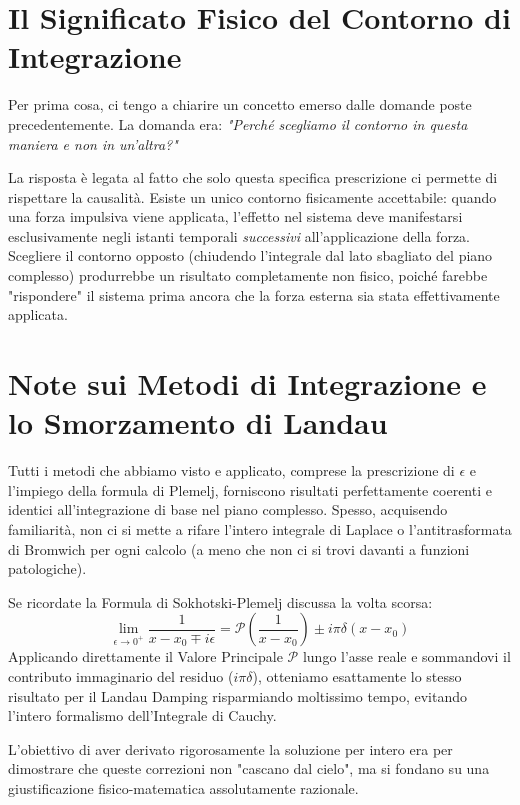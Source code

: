 \section{Il Significato Fisico del Contorno di Integrazione}

Per prima cosa, ci tengo a chiarire un concetto emerso dalle domande poste precedentemente. La domanda era: \textit{"Perché scegliamo il contorno in questa maniera e non in un'altra?"}

La risposta è legata al fatto che solo questa specifica prescrizione ci permette di rispettare la causalità. Esiste un unico contorno fisicamente accettabile: quando una forza impulsiva viene applicata, l'effetto nel sistema deve manifestarsi esclusivamente negli istanti temporali \textit{successivi} all'applicazione della forza. Scegliere il contorno opposto (chiudendo l'integrale dal lato sbagliato del piano complesso) produrrebbe un risultato completamente non fisico, poiché farebbe "rispondere" il sistema prima ancora che la forza esterna sia stata effettivamente applicata.

\section{Note sui Metodi di Integrazione e lo Smorzamento di Landau}

Tutti i metodi che abbiamo visto e applicato, comprese la prescrizione di $\epsilon$ e l'impiego della formula di Plemelj, forniscono risultati perfettamente coerenti e identici all'integrazione di base nel piano complesso. Spesso, acquisendo familiarità, non ci si mette a rifare l'intero integrale di Laplace o l'antitrasformata di Bromwich per ogni calcolo (a meno che non ci si trovi davanti a funzioni patologiche).

Se ricordate la Formula di Sokhotski-Plemelj discussa la volta scorsa:
\begin{equation}
\lim_{\epsilon \to 0^+} \frac{1}{x - x_0 \mp i\epsilon} = \mathcal{P}\left(\frac{1}{x - x_0}\right) \pm i\pi\delta(x - x_0)
\end{equation}
Applicando direttamente il Valore Principale $\mathcal{P}$ lungo l'asse reale e sommandovi il contributo immaginario del residuo ($i\pi\delta$), otteniamo esattamente lo stesso risultato per il Landau Damping risparmiando moltissimo tempo, evitando l'intero formalismo dell'Integrale di Cauchy.

L'obiettivo di aver derivato rigorosamente la soluzione per intero era per dimostrare che queste correzioni non "cascano dal cielo", ma si fondano su una giustificazione fisico-matematica assolutamente razionale.

